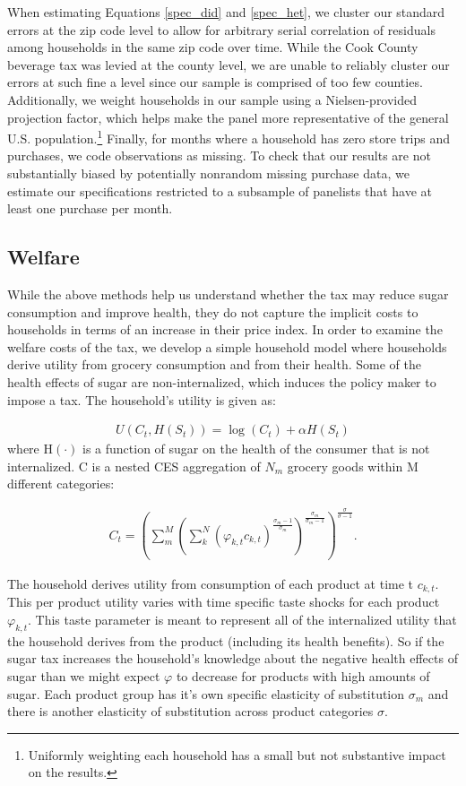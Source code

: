 \documentclass[12pt]{article}
\begin{document}
When estimating Equations \ref{spec_did} and \ref{spec_het}, we cluster our standard errors at the zip code level to allow for arbitrary serial correlation of residuals among households in the same zip code over time. While the Cook County beverage tax was levied at the county level, we are unable to reliably cluster our errors at such fine a level since our sample is comprised of too few counties. Additionally, we weight households in our sample using a Nielsen-provided projection factor, which helps make the panel more representative of the general U.S. population.\footnote{Uniformly weighting each household has a small but not substantive impact on the results.} Finally, for months where a household has zero store trips and purchases, we code observations as missing. To check that our results are not substantially biased by potentially nonrandom missing purchase data, we estimate our specifications restricted to a subsample of panelists that have at least one purchase per month.

\subsection{Welfare}

While the above methods help us understand whether the tax may reduce sugar consumption and improve health, they do not capture the implicit costs to households in terms of an increase in their price index. In order to examine the welfare costs of the tax, we develop a simple household model where households derive utility from grocery consumption and from their health. Some of the health effects of sugar are non-internalized, which induces the policy maker to impose a tax. The household's utility is given as:

\begin{align}
	U(C_t,H(S_t)) = \log(C_t) + \alpha H(S_t)
\end{align}
where H$(\cdot)$ is a function of sugar on the health of the consumer that is not internalized. C is a nested CES aggregation of $N_m$ grocery goods within M different categories:

\begin{align}
	C_t = \left( \sum_m^M \left( \sum_k^N (\varphi_{k,t} c_{k,t})^{\frac{\sigma_m-1}{\sigma_m}}\right)^{\frac{\sigma_m}{\sigma_m-1}} \right)^{\frac{\sigma}{\sigma-1}}.
\end{align}

The household derives utility from consumption of each product at time t $c_{k,t}$. This per product utility varies with time specific taste shocks for each product $\varphi_{k,t}$. This taste parameter is meant to represent all of the internalized utility that the household derives from the product (including its health benefits). So if the sugar tax increases the household's knowledge about the negative health effects of sugar than we might expect $\varphi$ to decrease for products with high amounts of sugar. Each product group has it's own specific elasticity of substitution $\sigma_m$ and there is another elasticity of substitution across product categories $\sigma$.
\end{document}
